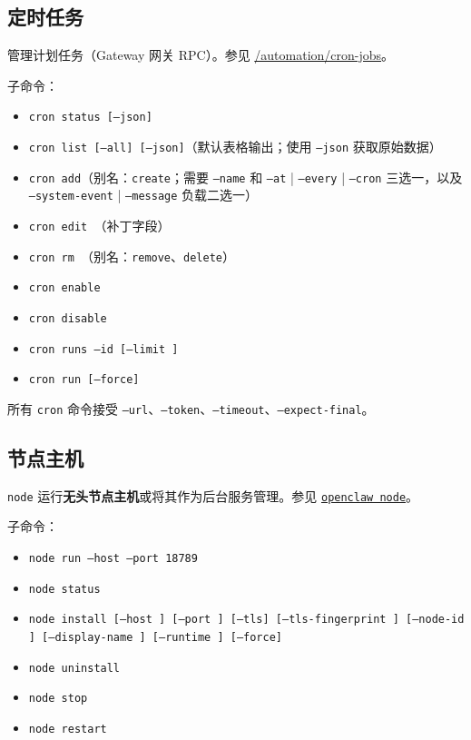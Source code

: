 \subsection{定时任务}


管理计划任务（Gateway 网关 RPC）。参见 \href{/automation/cron-jobs}{/automation/cron-jobs}。

子命令：

\begin{itemize}
  \item \texttt{cron status [--json]}
  \item \texttt{cron list [--all] [--json]}（默认表格输出；使用 \texttt{--json} 获取原始数据）
  \item \texttt{cron add}（别名：\texttt{create}；需要 \texttt{--name} 和 \texttt{--at} | \texttt{--every} | \texttt{--cron} 三选一，以及 \texttt{--system-event} | \texttt{--message} 负载二选一）
  \item \texttt{cron edit }（补丁字段）
  \item \texttt{cron rm }（别名：\texttt{remove}、\texttt{delete}）
  \item \texttt{cron enable }
  \item \texttt{cron disable }
  \item \texttt{cron runs --id  [--limit ]}
  \item \texttt{cron run  [--force]}
\end{itemize}


所有 \texttt{cron} 命令接受 \texttt{--url}、\texttt{--token}、\texttt{--timeout}、\texttt{--expect-final}。

\subsection{节点主机}


\texttt{node} 运行\textbf{无头节点主机}或将其作为后台服务管理。参见 \href{/cli/node}{\texttt{openclaw node}}。

子命令：

\begin{itemize}
  \item \texttt{node run --host  --port 18789}
  \item \texttt{node status}
  \item \texttt{node install [--host ] [--port ] [--tls] [--tls-fingerprint ] [--node-id ] [--display-name ] [--runtime ] [--force]}
  \item \texttt{node uninstall}
  \item \texttt{node stop}
  \item \texttt{node restart}
\end{itemize}


